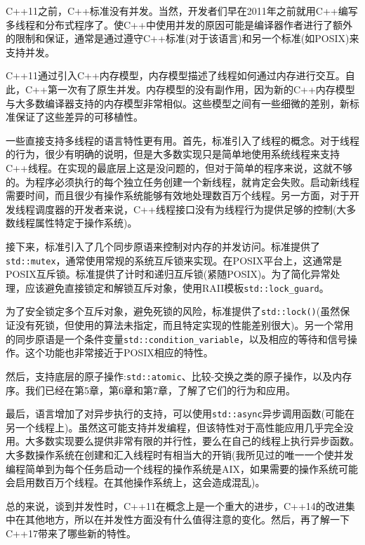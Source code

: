 C++11之前，C++标准没有并发。当然，开发者们早在2011年之前就用C++编写多线程和分布式程序了。使C++中使用并发的原因可能是编译器作者进行了额外的限制和保证，通常是通过遵守C++标准(对于该语言)和另一个标准(如POSIX)来支持并发。

C++11通过引入C++内存模型，内存模型描述了线程如何通过内存进行交互。自此，C++第一次有了原生并发。内存模型的没有副作用，因为新的C++内存模型与大多数编译器支持的内存模型非常相似。这些模型之间有一些细微的差别，新标准保证了这些差异的可移植性。

一些直接支持多线程的语言特性更有用。首先，标准引入了线程的概念。对于线程的行为，很少有明确的说明，但是大多数实现只是简单地使用系统线程来支持C++线程。在实现的最底层上这是没问题的，但对于简单的程序来说，这就不够的。为程序必须执行的每个独立任务创建一个新线程，就肯定会失败。启动新线程需要时间，而且很少有操作系统能够有效地处理数百万个线程。另一方面，对于开发线程调度器的开发者来说，C++线程接口没有为线程行为提供足够的控制(大多数线程属性特定于操作系统)。

接下来，标准引入了几个同步原语来控制对内存的并发访问。标准提供了\texttt{std::mutex}，通常使用常规的系统互斥锁来实现。在POSIX平台上，这通常是POSIX互斥锁。标准提供了计时和递归互斥锁(紧随POSIX)。为了简化异常处理，应该避免直接锁定和解锁互斥对象，使用RAII模板\texttt{std::lock\_guard}。

为了安全锁定多个互斥对象，避免死锁的风险，标准提供了\texttt{std::lock()}(虽然保证没有死锁，但使用的算法未指定，而且特定实现的性能差别很大)。另一个常用的同步原语是一个条件变量\texttt{std::condition\_variable}，以及相应的等待和信号操作。这个功能也非常接近于POSIX相应的特性。

然后，支持底层的原子操作:\texttt{std::atomic}、比较-交换之类的原子操作，以及内存序。我们已经在第5章，第6章和第7章，了解了它们的行为和应用。

最后，语言增加了对异步执行的支持，可以使用\texttt{std::async}异步调用函数(可能在另一个线程上)。虽然这可能支持并发编程，但该特性对于高性能应用几乎完全没用。大多数实现要么提供非常有限的并行性，要么在自己的线程上执行异步函数。大多数操作系统在创建和汇入线程时有相当大的开销(我所见过的唯一一个使并发编程简单到为每个任务启动一个线程的操作系统是AIX，如果需要的操作系统可能会启用数百万个线程。在其他操作系统上，这会造成混乱)。

总的来说，谈到并发性时，C++11在概念上是一个重大的进步，C++14的改进集中在其他地方，所以在并发性方面没有什么值得注意的变化。然后，再了解一下C++17带来了哪些新的特性。




































